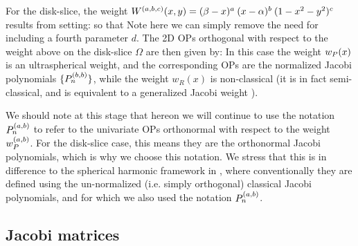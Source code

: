 For the disk-slice, the weight ${W^{(a,b,c)}}(x,y) = (\beta - x)^a \: (x - \alpha)^b \: (1-x^2-y^2)^c$ results from setting:
so that
Note here we can simply remove the need for including a fourth parameter $d$. The 2D OPs orthogonal with respect to the weight above on the disk-slice $\Omega$ are then given by:
In this case the weight $w_P(x)$ is an ultraspherical weight, and the corresponding OPs are the normalized Jacobi polynomials $\{{P}_n^{(b, b)}\}$, while the weight $w_R(x)$ is non-classical (it is in fact semi-classical, and is equivalent to a generalized Jacobi weight \cite[\S5]{magnus1995painleve}).

\remark We should note at this stage that hereon we will continue to use the notation ${P}_n^{(a, b)}$ to refer to the univariate OPs orthonormal with respect to the weight $w_P^{(a,b)}$. For the disk-slice case, this means they are the orthonormal Jacobi polynomials, which is why we choose this notation. We stress that this is in difference to the spherical harmonic framework in , where conventionally they are defined using the un-normalized (i.e. simply orthogonal) classical Jacobi polynomials, and for which we also used the notation ${P}_n^{(a, b)}$.



\subsection{Jacobi matrices}

